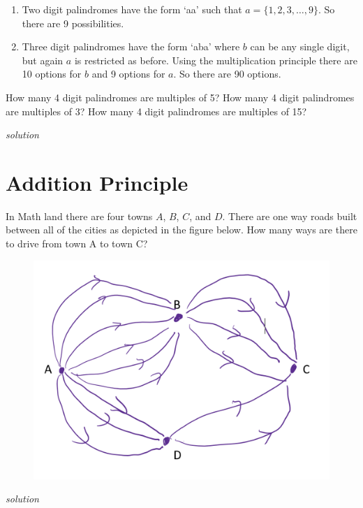 \documentclass{amsbook}
\begin{document}
\begin{Answer}[ref={m6}]
    \begin{enumerate}
        \item Two digit palindromes have the form `aa' such that $a=\{1,2,3,\ldots, 9\}$. So there are 9 possibilities.
        \item Three digit palindromes have the form `aba' where $b$ can be any single digit, but again $a$ is restricted as before. Using the multiplication principle there are 10 options for $b$ and 9 options for $a$. So there are 90 options.
    \end{enumerate}
\end{Answer}

\begin{Exercise}[title={Palindromes II}, difficulty=2, label=m7]
    \Question How many 4 digit palindromes are multiples of 5?
    \Question How many 4 digit palindromes are multiples of 3?
    \Question How many 4 digit palindromes are multiples of 15?

    \hfill \emph{solution} 
\end{Exercise}

\begin{Answer}[ref={m7}]
    
\end{Answer}

\section{Addition Principle}

\begin{Exercise}[title={Roads to Rome}, difficulty=0, label=ap1]
    In Math land there are four towns $A$, $B$, $C$, and $D$. There are one way roads built between all of the cities as depicted in the figure below. How many ways are there to drive from town A to town C?
    \begin{figure}[H]
        \includegraphics[width=.4\textwidth]{o.png}
    \end{figure}
    \hfill \emph{solution} 
\end{Exercise}
\end{document}
